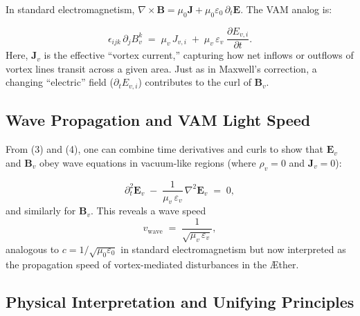 \documentclass[aps,preprint,superscriptaddress]{revtex4-2}
\begin{document}
    In standard electromagnetism, \(\nabla\times \mathbf{B} = \mu_0 \mathbf{J} + \mu_0\varepsilon_0\,\partial_t\mathbf{E}\). The VAM analog is:

    \[
        \epsilon_{ijk}\,\partial_j B_{v}^k
        \;=\;
        \mu_v\,J_{v,i}
        \;+\;
        \mu_v\,\varepsilon_v\;\frac{\partial E_{v,i}}{\partial t}.
        \tag{4}
    \]
    Here, \(\mathbf{J}_v\) is the effective “vortex current,” capturing how net inflows or outflows of vortex lines transit across a given area. Just as in Maxwell’s correction, a changing “electric” field (\(\partial_t E_{v,i}\)) contributes to the curl of \(\mathbf{B}_v\).

    \subsection{Wave Propagation and VAM Light Speed}

    From (3) and (4), one can combine time derivatives and curls to show that \(\mathbf{E}_v\) and \(\mathbf{B}_v\) obey wave equations in vacuum-like regions (where \(\rho_v=0\) and \(\mathbf{J}_v=0\)):

    \[
        \partial_t^2 \mathbf{E}_v
        \;-\;
        \frac{1}{\mu_v\,\varepsilon_v}\,
        \nabla^2 \mathbf{E}_v
        \;=\; 0,
    \]
    and similarly for \(\mathbf{B}_v\). This reveals a wave speed
    \[
        v_{\mathrm{wave}}
        \;=\;
        \frac{1}{\sqrt{\mu_v\,\varepsilon_v}},
    \]
    analogous to \(c = 1/\sqrt{\mu_0\varepsilon_0}\) in standard electromagnetism but now interpreted as the propagation speed of vortex-mediated disturbances in the Æther.

    \subsection{Physical Interpretation and Unifying Principles}
\end{document}
